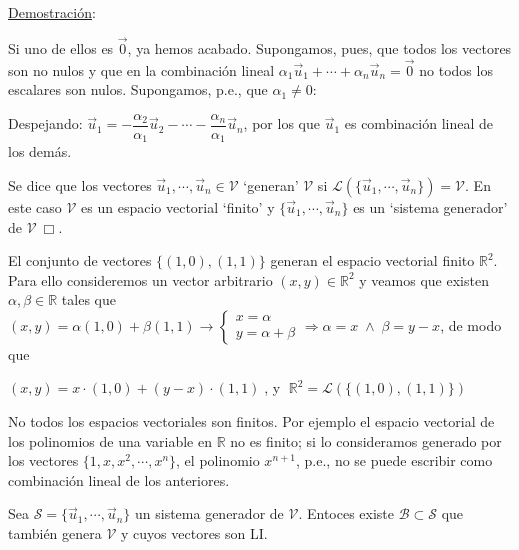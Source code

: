 \underline{Demostración}:

\noindent \textcolor{gris}{Si uno de ellos es $\vec 0$, ya hemos acabado. Supongamos, pues, que todos los vectores son no nulos y que en la combinación lineal  $\alpha_1 \vec u_1 + \cdots + \alpha_n \vec u_n=\vec 0$ no todos los escalares son nulos. Supongamos, p.e., que $\alpha_1 \neq 0$:  } 

\noindent \textcolor{gris}{ Despejando: $\vec u_1=-\dfrac{\alpha_2}{\alpha_1}\vec u_2 - \cdots -\dfrac{\alpha_n}{\alpha_1}\vec u_n$, por los que $\vec u_1$ es combinación lineal de los demás.   }
	


\begin{defi}
Se dice que los vectores $\vec u_1, \cdots, \vec u_n \in \mathcal V$ `generan' $\mathcal V$ si $\mathcal L (\{ \vec u_1, \cdots, \vec u_n \}) = \mathcal V$. En este caso $\mathcal V$ es un espacio vectorial `finito' y  $\{ \vec u_1, \cdots, \vec u_n \}$ es un `sistema generador' de $\mathcal V \ \Box$.
\end{defi}


\begin{cuadro-gris}
El conjunto de vectores 	$\{(1,0), (1,1)\}$ generan el espacio vectorial finito $\mathbb R^2$. Para ello consideremos un vector arbitrario $(x,y) \in \mathbb R^2$ y veamos que existen $\alpha, \beta \in \mathbb R$ tales que $(x,y)=\alpha (1,0)+\beta(1,1)  \longrightarrow \begin{cases} x=\alpha \\ y= \alpha+\beta \end{cases} \Rightarrow \alpha=x \; \wedge \; \beta=y-x$, de modo que 

$(x,y)=x\cdot (1,0)+ (y-x)\cdot (1,1)\; $, y $\; \mathbb R^2 = \mathcal L(\{(1,0), (1,1)\})$


\textcolor{gris}{No todos los espacios vectoriales son finitos. Por ejemplo el espacio vectorial de los polinomios de una variable en $\mathbb R$ no es finito; si lo consideramos generado por los vectores $\{1,x,x^2,\cdots ,x^n\}$, el polinomio $x^{n+1}$, p.e., no se puede escribir como combinación lineal de los anteriores.}
\end{cuadro-gris}

\begin{theorem}

Sea $\mathcal S=\{\vec u_1, \cdots, \vec u_n \}$ un sistema generador de $\mathcal V$. Entoces existe $\mathcal B \subset \mathcal S$	 que también genera $\mathcal V$ y cuyos vectores son LI.
\end{theorem}

